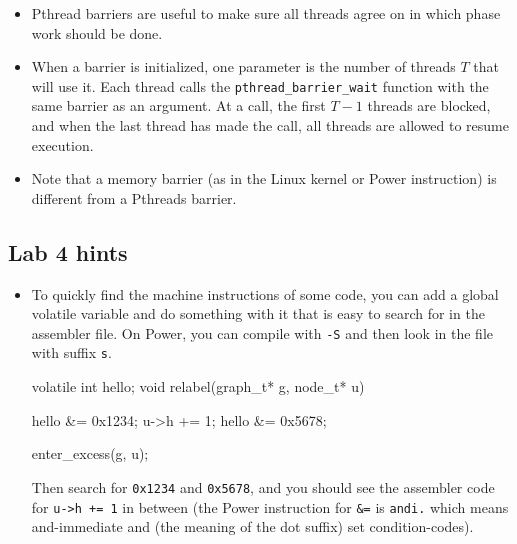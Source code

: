 \documentclass{forsete}
\begin{document}
\begin{itemize}
\begin{ccode}
{	c *= 2; // double the capacity
	b = realloc(a, c * sizeof(a[0]));
	if (b == NULL)
		error("no memory");
	a = b;
}

a[i].x = x;
a[i].y = y;
i += 1;
\end{ccode}
When the array is no longer needed, you call \verb!free(a)!, but you should not
free the old array after using \verb.realloc., since that is taken care of by
\verb.realloc. if needed (it can happen that \verb.realloc. found available memory
after the end of \verb.a. so no free was needed).

\item Pthread barriers are useful to make sure all threads agree on 
in which phase work should be done. 

\item When a barrier is initialized, one parameter is the number of
threads $T$ that will use it. Each thread calls the
\verb.pthread_barrier_wait. 
function with the same barrier as an 
argument. At a call, the first $T-1$ threads are blocked, and when the last thread has
made the call, all threads are allowed to resume execution.

\item Note that a memory barrier (as in the Linux kernel or Power instruction) is different from a Pthreads barrier.


\end{itemize}


\subsection*{Lab 4 hints}
\begin{itemize}
\item To quickly find the machine instructions of some code, you can 
add a global volatile variable and do something with it that is easy to search for in
the assembler file.
On Power, you can compile with \verb.-S. and then look in the file with suffix \verb.s.. 
\begin{ccode}
volatile int hello;
void relabel(graph_t* g, node_t* u)
{
	hello &= 0x1234;
        u->h += 1;
	hello &= 0x5678;

        enter_excess(g, u);
}
\end{ccode}
Then search for \verb.0x1234. and \verb.0x5678., and you should see the assembler code for \verb.u->h += 1. in
between (the Power instruction for \verb.&=. is \verb!andi.! which means and-immediate and (the meaning of the dot suffix) set condition-codes).




\end{itemize}
\end{document}
